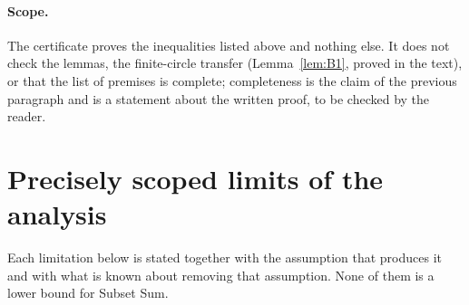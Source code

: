\documentclass[11pt]{article}
\theoremstyle{definition}
\begin{document}
\paragraph{Scope.} The certificate proves the inequalities listed above and nothing else. It does not check the
lemmas, the finite-circle transfer (Lemma~\ref{lem:B1}, proved in the text), or that the list of premises is
complete; completeness is the claim of the previous paragraph and is a statement about the written proof, to be
checked by the reader.
\section{Precisely scoped limits of the analysis}\label{sec:limits}
Each limitation below is stated together with the assumption that produces it and with what is known about
removing that assumption. None of them is a lower bound for Subset Sum.
\end{document}
